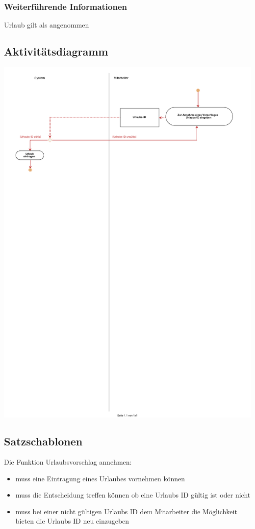\subsubsection{Weiterführende Informationen}
Urlaub gilt als angenommen

\subsection{Aktivitätsdiagramm}

\begin{center}
\includegraphics[width=0.9\linewidth]{Urlaubsvorschlag_annehmen.pdf}
\end{center}

\subsection{Satzschablonen}
Die Funktion Urlaubsvorschlag annehmen:
\begin{itemize}
	\item muss eine Eintragung eines Urlaubes vornehmen können
	\item muss die Entscheidung treffen können ob eine Urlaubs ID gültig ist oder nicht
	\item muss bei einer nicht gültigen Urlaubs ID dem Mitarbeiter die Möglichkeit bieten die Urlaubs ID neu einzugeben
\end{itemize}


